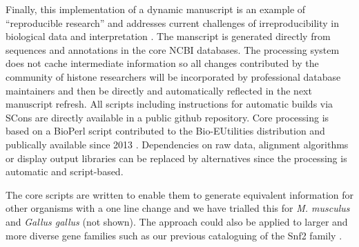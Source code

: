 	Finally, this implementation of a dynamic manuscript 
	is an example of ``reproducible research'' \citep{reproducible-research-bioinformatics,reproducible-research-law}
	and addresses current challenges of irreproducibility in biological data and interpretation \citep{ErrorProne2012,OpenPrograms2012}.
	The manscript is generated directly from sequences and annotations in the core NCBI databases.
	The processing system does not cache intermediate information so all changes contributed by
	the community of histone researchers will be incorporated by professional database maintainers 
	and then be directly and automatically reflected in the next manuscript refresh.
	All scripts including instructions for automatic builds via SCons \citep{SCons2005}
	are directly available in a public github repository.
	Core processing is based on a BioPerl script contributed to the Bio-EUtilities distribution 
	and publically available since 2013 \citep{BioPerl2002} .
	Dependencies on raw data, alignment algorithms or display output libraries
	can be replaced by alternatives since the processing is automatic and script-based.

	The core scripts are written to enable them to generate 
	equivalent information for other organisms with a one line change 
	and we have trialled this for \textit{M. musculus} and \textit{Gallus gallus} (not shown).
	The approach could also be applied to larger and more diverse gene families such as
	our previous cataloguing of the Snf2 family \citep{andrew-snf2-catalogue}.